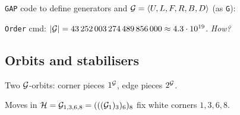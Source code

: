 
\begin{slide}
    \texttt{GAP} code to define generators and $\mathcal{G} = \langle U,L,F,R,B,D \rangle$ (as \texttt{G}):

    {\footnotesize} \pause

    \texttt{Order} cmd: $|\mathcal{G}| = 43\,252\,003\,274\,489\,856\,000 \approx 4.3 \cdot 10^{19}$. \textit{How?}
\end{slide}

\subsection{Orbits and stabilisers}

\begin{slide}
    \begin{overprint}
        \begin{center}
        \end{center}

        \scriptsize

        \normalsize Two $\mathcal{G}$-orbits: corner pieces $1^{\mathcal{G}}$, edge pieces $2^{\mathcal{G}}$.

        Moves in $\mathcal{H} = \mathcal{G}_{1,3,6,8} = (((\mathcal{G}_1)_3)_6)_8$ fix white corners $1,3,6,8$.

    \end{overprint}
\end{slide}


